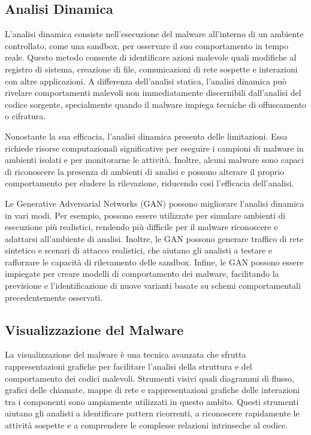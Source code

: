 \subsection{Analisi Dinamica}
L'analisi dinamica consiste nell'esecuzione del malware all'interno di un ambiente controllato, come una sandbox, per osservare il suo comportamento in tempo reale. Questo metodo consente di identificare azioni malevole quali modifiche al registro di sistema, creazione di file, comunicazioni di rete sospette e interazioni con altre applicazioni. A differenza dell'analisi statica, l'analisi dinamica può rivelare comportamenti malevoli non immediatamente discernibili dall'analisi del codice sorgente, specialmente quando il malware impiega tecniche di offuscamento o cifratura.

Nonostante la sua efficacia, l'analisi dinamica presenta delle limitazioni. Essa richiede risorse computazionali significative per eseguire i campioni di malware in ambienti isolati e per monitorarne le attività. Inoltre, alcuni malware sono capaci di riconoscere la presenza di ambienti di analisi e possono alterare il proprio comportamento per eludere la rilevazione, riducendo così l'efficacia dell'analisi.

Le Generative Adversarial Networks (GAN) possono migliorare l'analisi dinamica in vari modi. Per esempio, possono essere utilizzate per simulare ambienti di esecuzione più realistici, rendendo più difficile per il malware riconoscere e adattarsi all'ambiente di analisi. Inoltre, le GAN possono generare traffico di rete sintetico e scenari di attacco realistici, che aiutano gli analisti a testare e rafforzare le capacità di rilevamento delle sandbox. Infine, le GAN possono essere impiegate per creare modelli di comportamento dei malware, facilitando la previsione e l'identificazione di nuove varianti basate su schemi comportamentali precedentemente osservati.


\subsection{Visualizzazione del Malware}
La visualizzazione del malware è una tecnica avanzata che sfrutta rappresentazioni grafiche per facilitare l'analisi della struttura e del comportamento dei codici malevoli. Strumenti visivi quali diagrammi di flusso, grafici delle chiamate, mappe di rete e rappresentazioni grafiche delle interazioni tra i componenti sono ampiamente utilizzati in questo ambito. Questi strumenti aiutano gli analisti a identificare pattern ricorrenti, a riconoscere rapidamente le attività sospette e a comprendere le complesse relazioni intrinseche al codice.

